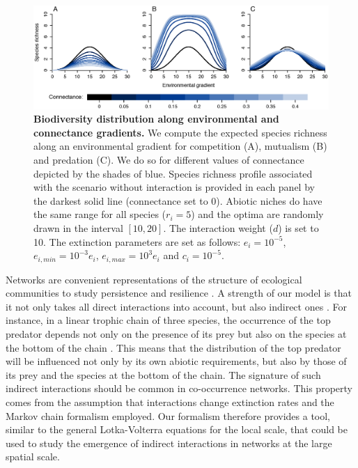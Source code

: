 \begin{figure}[h!]
\centering
\includegraphics [width=\textwidth]{./chapitre1/fig5.eps}
\caption{\textbf{Biodiversity distribution along environmental and connectance gradients.} We compute the expected species richness along an environmental gradient for competition (A), mutualism (B) and predation (C). We do so for different values of connectance depicted by the shades of blue. Species richness profile associated with the scenario without interaction is provided in each panel by the darkest solid line (connectance set to 0). Abiotic niches do have the same range for all species ($r_i=5$) and the optima are randomly drawn in the interval $[10,20]$. The interaction weight ($d$) is set to 10. The extinction parameters are set as follows: $e_i=10^{-5}$, $e_{i,min}=10^{-3}e_i$, $e_{i,max}=10^{3}e_i$ and $c_i=10^{-5}$.}
\label{chap1fig5}
\end{figure}

Networks are convenient representations of the structure of ecological communities to study persistence and resilience \citep{Thebault2010}. A strength of our model is that it not only takes all direct interactions into account, but also indirect ones \citep{Wootton1994}. For instance, in a linear trophic chain of three species, the occurrence of the top predator depends not only on the presence of its prey but also on the species at the bottom of the chain \citep{Gravel2011}. This means that the distribution of the top predator will be influenced not only by its own abiotic requirements, but also by those of its prey and the species at the bottom of the chain. The signature of such indirect interactions should be common in co-occurrence networks. This property comes from the assumption that interactions change extinction rates and the Markov chain formalism employed. Our formalism therefore provides a tool, similar to the general Lotka-Volterra equations for the local scale, that could be used to study the emergence of indirect interactions in networks at the large spatial scale.

